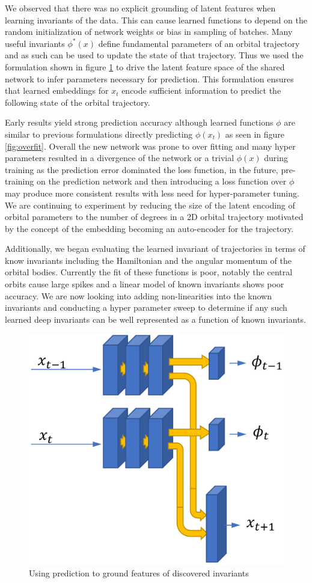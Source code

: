 \documentclass[10pt,letterpaper]{report}
\author{Brandon Houghton}
\begin{document}
We observed that there was no explicit grounding of latent features when learning invariants of the data. This can cause learned functions to depend on the random initialization of network weights or bias in sampling of batches. Many useful invariants $\phi^*(x)$ define fundamental parameters of an orbital trajectory and as such can be used to update the state of that trajectory. Thus we used the formulation shown in figure \ref{fig:prednetwork} to drive the latent feature space of the shared network to infer parameters necessary for prediction. This formulation ensures that learned embeddings for $x_t$ encode sufficient information to predict the following state of the orbital trajectory.

Early results yield strong prediction accuracy although learned functions $\phi$ are similar to previous formulations directly predicting $\phi (x_t)$ as seen in figure \ref{fig:overfit}. Overall the new network was prone to over fitting and many hyper parameters resulted in a divergence of the network or a trivial $\phi(x)$ during training as the prediction error dominated the loss function, in the future, pre-training on the prediction network and then introducing a loss function over $\phi$ may produce more consistent results with less need for hyper-parameter tuning. We are continuing to experiment by reducing the size of the latent encoding of orbital parameters to the number of degrees in a 2D orbital trajectory motivated by the concept of the embedding becoming an auto-encoder for the trajectory.

Additionally, we began evaluating the learned invariant of trajectories in terms of know invariants including the Hamiltonian and the angular momentum of the orbital bodies. Currently the fit of these functions is poor, notably the central orbits cause large spikes and a linear model of known invariants shows poor accuracy. We are now looking into adding non-linearities into the known invariants and conducting a hyper parameter sweep to determine if any such learned deep invariants can be well represented as a function of known invariants.  


\begin{figure}
	\centering
	\includegraphics[width=0.7\linewidth]{./images/predNetwork}
	\caption{Using prediction to ground features of discovered invariants}
	\label{fig:prednetwork}
\end{figure}
\end{document}
